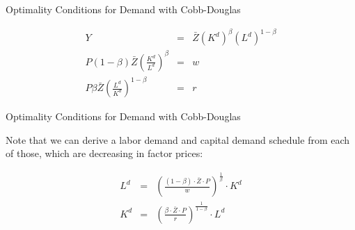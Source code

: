 \documentclass[notes,11pt, aspectratio=169, xcolor=table]{beamer}
\begin{document}
\begin{frame}{Optimality Conditions for Demand with Cobb-Douglas}

  \begin{eqnarray*}
    Y &=& \bar{Z} (K^d)^{\beta} (L^d)^{1-\beta} \\
    P (1-\beta) \bar{Z} \left( \frac{K^d}{L^d} \right)^\beta  &=& w \\
    P \beta \bar{Z} \left( \frac{L^d}{K^d} \right)^{1-\beta}  &=& r 
  \end{eqnarray*}

\end{frame}

\begin{frame}{Optimality Conditions for Demand with Cobb-Douglas}

  Note that we can derive a labor demand and capital demand schedule from each of those, which are decreasing in factor prices:

  \begin{eqnarray*}
    L^d &=& \left( \frac{(1-\beta) \cdot  \bar{Z} \cdot P}{w} \right)^{\frac{1}{\beta}} \cdot K^d \\
    K^d &=& \left( \frac{\beta \cdot \bar{Z} \cdot P}{r} \right)^{\frac{1}{1-\beta}} \cdot L^d
  \end{eqnarray*}

\end{frame}
\end{document}
